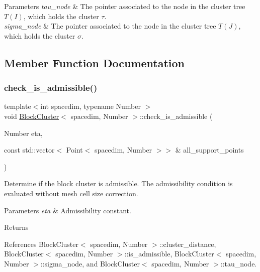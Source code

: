 \begin{DoxyParams}{Parameters}
{\em tau\+\_\+node} & The pointer associated to the node in the cluster tree $T(I)$, which holds the cluster $\tau$. \\
\hline
{\em sigma\+\_\+node} & The pointer associated to the node in the cluster tree $T(J)$, which holds the cluster $\sigma$. \\
\hline
\end{DoxyParams}


\subsection{Member Function Documentation}
\mbox{\label{classBlockCluster_a1f56a4b4d2c24fe8e78a954e13134ee1}} 
\subsubsection{\texorpdfstring{check\+\_\+is\+\_\+admissible()}{check\_is\_admissible()}\hspace{0.1cm}{\footnotesize\ttfamily [1/2]}}
{\footnotesize\ttfamily template$<$int spacedim, typename Number $>$ \\
void \hyperlink{classBlockCluster}{Block\+Cluster}$<$ spacedim, Number $>$\+::check\+\_\+is\+\_\+admissible (\begin{DoxyParamCaption}\item[{Number}]{eta,  }\item[{const std\+::vector$<$ Point$<$ spacedim, Number $>$$>$ \&}]{all\+\_\+support\+\_\+points }\end{DoxyParamCaption})}

Determine if the block cluster is admissible. The admissibility condition is evaluated without mesh cell size correction.


\begin{DoxyParams}{Parameters}
{\em eta} & Admissibility constant. \\
\hline
\end{DoxyParams}
\begin{DoxyReturn}{Returns}

\end{DoxyReturn}


References Block\+Cluster$<$ spacedim, Number $>$\+::cluster\+\_\+distance, Block\+Cluster$<$ spacedim, Number $>$\+::is\+\_\+admissible, Block\+Cluster$<$ spacedim, Number $>$\+::sigma\+\_\+node, and Block\+Cluster$<$ spacedim, Number $>$\+::tau\+\_\+node.



